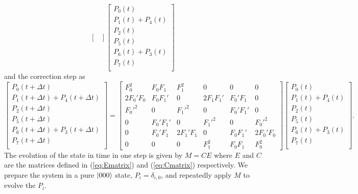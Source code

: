 \documentclass{report}
\begin{document}
\begin{appendices}
\begin{equation}
\begin{bmatrix}
    \end{bmatrix}
    \begin{bmatrix}
        P_0(t) \\
        P_1(t) + P_4(t) \\
        P_2(t) \\
        P_5(t) \\
        P_6(t)  + P_3(t)\\
        P_7(t) \\
    \end{bmatrix}
\end{equation}
and the correction step as
\begin{equation} \label{eq:Cmatrix}
    \begin{bmatrix}
        P_0(t+\Delta t) \\
        P_1(t+\Delta t) + P_4(t+\Delta t) \\
        P_2(t+\Delta t) \\
        P_5(t+\Delta t) \\
        P_6(t+\Delta t)  + P_3(t + \Delta t)\\
        P_7(t+\Delta t) \\
    \end{bmatrix}
    =
    \begin{bmatrix}
        F_0^2 & F_0 F_1 & F_1^2 & 0 & 0 & 0 \\
        2F_0'F_0 & F_0 F_1' & 0 & 2F_1 F_1' & F_0' F_1 & 0\\
        F_0'^2 & 0 & F_1'^2 & 0 & F_0' F_1' & 0 \\
        0 & F_0' F_1' & 0 & F_1'^2 & 0 &F_0'^2 \\
        0 &F_0' F_1 & 2F_1' F_1&0&F_0F_1'&2F_0'F_0 \\
        0&0&0& F_1^2 &F_0 F_1 & F_0^2
    \end{bmatrix}
    \begin{bmatrix}
        P_0(t) \\
        P_1(t) + P_4(t) \\
        P_2(t) \\
        P_5(t) \\
        P_6(t)  + P_3(t)\\
        P_7(t) \\
    \end{bmatrix}.
\end{equation}
The evolution of the state in time in one step is given by $M = CE$ where $E$ and $C$ are the matrices defined in (\ref{eq:Ematrix}) and (\ref{eq:Cmatrix}) respectively. We prepare the system in a pure $\ket{000}$ state, $P_i = \delta_{i,0}$, and repeatedly apply $M$ to evolve the $P_i$.  





\end{appendices}
\end{document}
